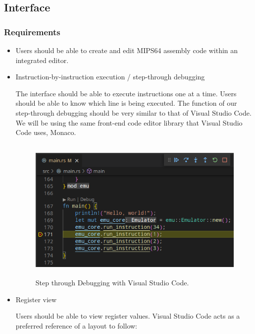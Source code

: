 \documentclass[
    paper=letter,
    parskip=half,
    fontsize=12pt,
    titlepage=firstiscover,
    toc=bibliography,
    numbers=endperiod
]{scrartcl}
\begin{document}
\subsection{Interface}
\subsubsection{Requirements}

\begin{itemize}
    \item Users should be able to create and edit MIPS64 assembly code within an
          integrated editor.
    \item Instruction-by-instruction execution / step-through debugging

          The interface should be able to execute instructions one at a time.
          Users should be able to know which line is being executed. The function
          of our step-through debugging should be very similar to that of Visual
          Studio Code. We will be using the same front-end code editor library
          that Visual Studio Code uses, Monaco.

          \begin{figure}[H]
              \includegraphics[height=7cm]{step-through-debugging}
              \caption{Step through Debugging with Visual Studio Code.}
          \end{figure}

    \item Register view

          Users should be able to view register values. Visual Studio Code acts as
          a preferred reference of a layout to follow:


\end{itemize}
\end{document}
